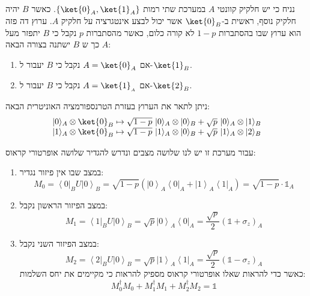 \documentclass{tstextbook}
\begin{document}
\begin{definition}
נניח כי יש חלקיק קוונטי \(A\) במערכת שתי רמות \(\left\{  \ket{0}_{A},\ket{1}_{A}  \right\}\). כאשר \(B\) יהיה חלקיק נוסף, ראשית ב-\(\ket{0}_{B}\) אשר יכול לבצע אינטגרציה על חלקיק \(A\). 
ערוץ דה פזה הוא ערוץ שבו בהסתברות \(1-p\) לא קורה כלום, כאשר מהסתברות \(p\) נקבל כי \(B\) יתפזר מעל \(A\) כך ש \(B\) ישתנה בצורה הבאה:

  \begin{enumerate}
    \item אם \(A=\ket{0}_{A}\)  נקבל כי \(B\) יעבור ל-\(\ket{1}_{B}\). 


    \item אם \(A=\ket{1}_{_{A}}\) נקבל כי \(B\) יעבור ל-\(\ket{2}_{B}\). 


  \end{enumerate}
\end{definition}
\begin{proposition}
ניתן לתאר את הערוץ בעזרת הטרנספורמציה האוניטרית הבאה:
$$\begin{array}{l}{{|0\rangle_{A}\otimes \ket{0}_{B} \mapsto\sqrt{1-p}\ |0\rangle_{A}\otimes|0\rangle_{B}+\sqrt{p}\ |0\rangle_{A}\otimes|1\rangle_{B}}}\\ {{|1\rangle_{A}\otimes \ket{0}_{B}\mapsto\sqrt{1-p}\ |1\rangle_{A}\otimes|0\rangle_{B}+\sqrt{p}\ |1\rangle_{A}\otimes|2\rangle_{B}}}\end{array}$$

\end{proposition}
\begin{proposition}
עבור מערכת זו יש לנו שלושה מצבים ונדרש להגדיר שלושה אופרטורי קראוס:

  \begin{enumerate}
    \item במצב שבו אין פיזור נגדיר: 
$$M_{0}=\left\langle0\right|_{B}U\left|0\right\rangle_{B}=\sqrt{1-p}\left(\left|0\right\rangle_{A}\left\langle0\right|_{A}+\left|1\right\rangle_{A}\left\langle1\right|_{A}\right)=\sqrt{1-p}\cdot\mathbb{1}_{A}$$


    \item במצב הפיזור הראשון נקבל: 
$$M_{1}=\left\langle1\right|_{B}U\left|0\right\rangle_{B}=\sqrt{p}\left|0\right\rangle_{A}\left\langle0\right|_{A}=\frac{\sqrt{p}}{2}\left(\mathbb{1}+\sigma_{z}\right)_{A}$$


    \item במצב הפיזור השני נקבל: 
$$M_{2}=\left\langle2\right|_{B}U\left|0\right\rangle_{B}=\sqrt{p}\left|1\right\rangle_{A}\left\langle1\right|_{A}=\frac{\sqrt{p}}{2}\left(\mathbb{1}-\sigma_{z}\right)_{A}$$
כאשר כדי להראות שאלו אופרטורי קראוס מספיק להראות כי מקיימים את יחס השלמות:
$$M_{0}^{\dagger}M_{0} + M_{1}^{\dagger}M_{1}+M_{2}^{\dagger}M_{2}=\mathbb{1} $$


  \end{enumerate}
\end{proposition}
\end{document}
